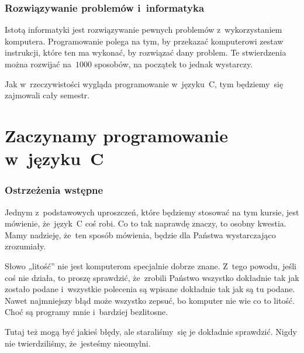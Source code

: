 \documentclass[10pt,t]{beamer}
\begin{document}
\begin{frame}
  \frametitle{Rozwiązywanie problemów i~informatyka}


  Istotą informatyki jest rozwiązywanie pewnych problemów z~wykorzystaniem
  komputera. Programowanie polega na tym, by przekazać komputerowi zestaw
  instrukcji, które ten ma wykonać, by rozwiązać dany problem. Te
  stwierdzenia można rozwijać na~$1000$ sposobów, na początek to jednak
  wystarczy.

  Jak w~rzeczywistości wygląda programowanie w~języku~C, tym będziemy~się
  zajmowali cały semestr.

\end{frame}










\section{Zaczynamy programowanie w~języku~C}


\begin{frame}
  \frametitle{Ostrzeżenia wstępne}


  Jednym z~podstawowych uproszczeń, które będziemy stosować na tym kursie,
  jest mówienie, że~język~C coś robi. Co to tak naprawdę znaczy, to osobny
  kwestia. Mamy nadzieję, że~ten sposób mówienia, będzie dla Państwa
  wystarczająco zrozumiały.

  Słowo „litość” nie jest komputerom specjalnie dobrze znane. Z~tego
  powodu, jeśli coś nie działa, to proszę sprawdzić, że~zrobili
  Państwo \alert{wszystko} dokładnie tak jak zostało podane i~wszystkie
  polecenia są wpisane \alert{dokładnie} tak jak są tu podane. Nawet
  najmniejszy błąd może wszystko zepsuć, bo komputer nie wie co to litość.
  Choć są programy mnie i~bardziej bezlitosne.

  Tutaj też mogą być jakieś błędy, ale staraliśmy~się je dokładnie
  sprawdzić. Nigdy nie twierdziliśmy, że~jesteśmy nieomylni.

\end{frame}





\end{document}

